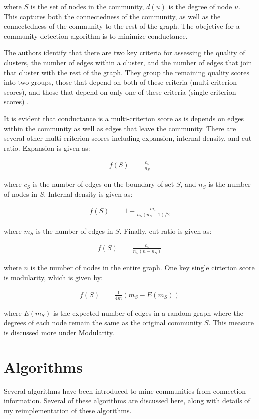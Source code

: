 \documentclass{article}
\begin{document}
where $S$ is the set of nodes in the community, $d(u)$ is the degree of node $u$. This captures both the connectedness of the community, as well as the connectedness of the community to the rest of the graph. The obejctive for a community detection algorithm is to minimize conductance.
\par
The authors identify that there are two key criteria for assessing the quality of clusters, the number of edges within a cluster, and the number of edges that join that cluster with the rest of the graph. They group the remaining quality scores into two groups, those that depend on both of these criteria (multi-criterion scores), and those that depend on only one of these criteria (single criterion scores) \cite{Leskovec:2010:ECA:1772690.1772755}.
\par
It is evident that conductance is a multi-criterion score as is depends on edges within the community as well as edges that leave the community. There are several other multi-criterion scores including expansion, internal density, and cut ratio. Expansion is given as:

\begin{align}
    f(S) &= \frac{c_S}{n_S}
\end{align}

where $c_S$ is the number of edges on the boundary of set $S$, and $n_S$ is the number of nodes in $S$. Internal density is given as:

\begin{align}
    f(S) &= 1 - \frac{m_S}{n_S(n_S - 1)/2}
\end{align}

where $m_S$ is the number of edges in $S$. Finally, cut ratio is given as:

\begin{align}
    f(S) &= \frac{c_S}{n_S(n - n_S)}
\end{align}

where $n$ is the number of nodes in the entire graph. One key single cirterion score is modularity, which is given by:

\begin{align}
    f(S) &= \frac{1}{4m}(m_S - E(m_S))
\end{align}

where $E(m_S)$ is the expected number of edges in a random graph where the degrees of each node remain the same as the original community $S$. This measure is discussed more under Modularity.

\section{Algorithms}
Several algorithms have been introduced to mine communities from connection information. Several of these algorithms are discussed here, along with details of my reimplementation of these algorithms.
\end{document}
